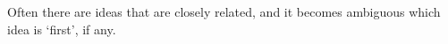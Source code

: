 Often there are ideas that are closely related, and it becomes ambiguous which idea is `first', if any.